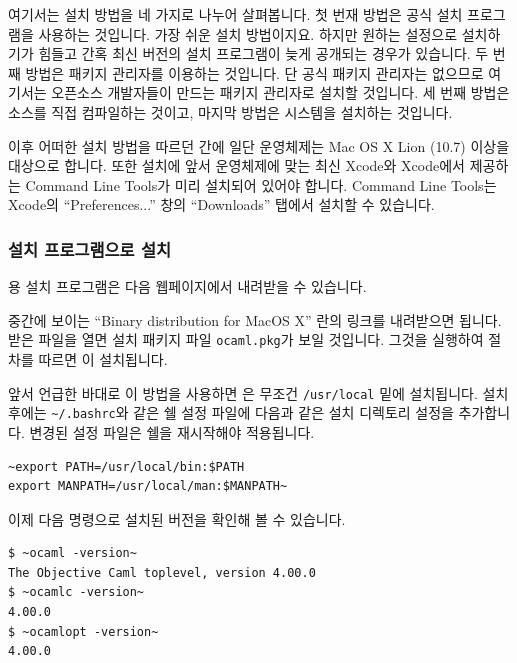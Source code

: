 여기서는 \OCAML{} 설치 방법을 네 가지로 나누어 살펴봅니다. 첫 번재 방법은
\OCAML{} 공식 설치 프로그램을 사용하는 것입니다. 가장 쉬운 설치 방법이지요.
하지만 원하는 설정으로 설치하기가 힘들고 간혹 최신 버전의 설치 프로그램이 늦게
공개되는 경우가 있습니다. 두 번째 방법은 패키지 관리자를 이용하는 것입니다. 단
\MAC{} 공식 패키지 관리자는 없으므로 여기서는 오픈소스 개발자들이 만드는
\BREW{} 패키지 관리자로 설치할 것입니다. 세 번째 방법은 소스를 직접 컴파일하는
것이고, 마지막 방법은 \GODI{} 시스템을 설치하는 것입니다.

이후 어떠한 설치 방법을 따르던 간에 일단 운영체제는 \textsf{Mac OS X Lion}
(10.7) 이상을 대상으로 합니다. 또한 설치에 앞서 운영체제에 맞는 최신
\textsf{Xcode}와 \textsf{Xcode}에서 제공하는 \textsf{Command Line Tools}가
미리 설치되어 있어야 합니다. \textsf{Command Line Tools}는 \textsf{Xcode}의
``Preferences...'' 창의 ``Downloads'' 탭에서 설치할 수 있습니다.

\subsubsection{설치 프로그램으로 설치}

\MAC{} 용 \OCAML{} 설치 프로그램은 다음 웹페이지에서 내려받을 수 있습니다.

\begin{center}
\end{center}

중간에 보이는 ``Binary distribution for MacOS X'' 란의 링크를 내려받으면
됩니다. 받은 파일을 열면 설치 패키지 파일 \texttt{ocaml.pkg}가 보일
것입니다. 그것을 실행하여 절차를 따르면 \OCAML{}이 설치됩니다.

앞서 언급한 바대로 이 방법을 사용하면 \OCAML{}은 무조건 \texttt{/usr/local}
밑에 설치됩니다. 설치 후에는 \texttt{\~{}/.bashrc}와 같은 쉘 설정 파일에
다음과 같은 설치 디렉토리 설정을 추가합니다. 변경된 설정 파일은 쉘을 재시작해야
적용됩니다.

\begin{lstlisting}
~export PATH=/usr/local/bin:$PATH
export MANPATH=/usr/local/man:$MANPATH~
\end{lstlisting}

이제 다음 명령으로 설치된 \OCAML{} 버전을 확인해 볼 수 있습니다.

\begin{lstlisting}
$ ~ocaml -version~
The Objective Caml toplevel, version 4.00.0
$ ~ocamlc -version~
4.00.0
$ ~ocamlopt -version~
4.00.0
\end{lstlisting}

